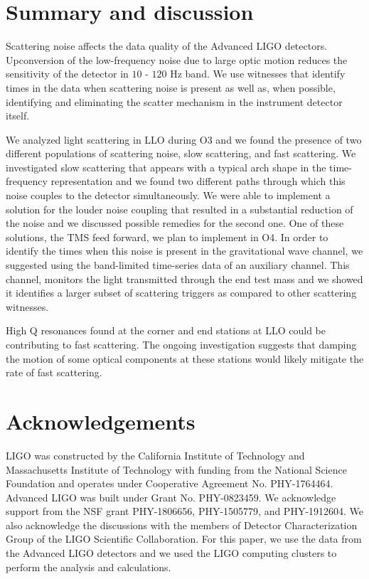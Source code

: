 \documentclass[12pt]{iopart}
\begin{document}
\newpage
\section{Summary and discussion}\label{summary}
 Scattering noise affects the data quality of the Advanced LIGO detectors. Upconversion of the low-frequency noise due to large optic motion reduces the sensitivity of the detector in $10$ - $120$ Hz band. We use witnesses that identify times in the data when scattering noise is present as well as, when possible, identifying and eliminating the scatter mechanism in the instrument detector itself. 

We analyzed light scattering in LLO during O3 and we found the presence of two different populations of scattering noise, slow scattering, and fast scattering. We investigated slow scattering that appears with a typical arch shape in the time-frequency representation and we found two different paths through which this noise couples to the detector simultaneously. We were able to implement a solution for the louder noise coupling that resulted in a substantial reduction of the noise and we discussed possible remedies for the second one. One of these solutions, the TMS feed forward, we plan to implement in O4. 
In order to identify the times when this noise is present in the gravitational wave channel, we suggested using the band-limited time-series data of an auxiliary channel. This channel, monitors the light transmitted through the end test mass and we showed it identifies a larger subset of scattering triggers as compared to other scattering witnesses.

High Q resonances found at the corner and end stations at LLO could be contributing to fast scattering. The ongoing investigation suggests that damping the motion of some optical components at these stations would likely mitigate the rate of fast scattering.
\par

\section{Acknowledgements} LIGO was constructed by the California Institute of Technology and Massachusetts Institute of Technology with funding from the National Science Foundation and operates under Cooperative Agreement No. PHY-1764464. Advanced LIGO was built under Grant No. PHY-0823459. We acknowledge support from the NSF grant PHY-1806656, PHY-1505779, and  PHY-1912604. We also acknowledge the discussions with the members of Detector Characterization Group of the LIGO Scientific Collaboration. For this paper, we use the data from the Advanced LIGO detectors and we used the LIGO computing clusters to perform the analysis and calculations.
\end{document}
